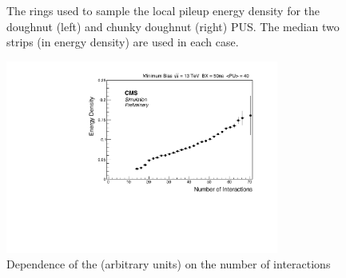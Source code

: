 \begin{figure}
\hfill
{}
\hfill
{}
\hfill
\caption{The rings used to sample the local pileup energy density for the doughnut (left) and chunky doughnut (right)
PUS. The median two strips (in energy density) are used in each case.}
\end{figure}

\begin{figure}
\centering
    \includegraphics[width=0.8\textwidth]{./Figures/triggerUpgrade/threestrips}
  \caption{Dependence of the \rhoC (arbitrary units) on the number of interactions}
  \label{fig:threestripNint}
\end{figure}  

